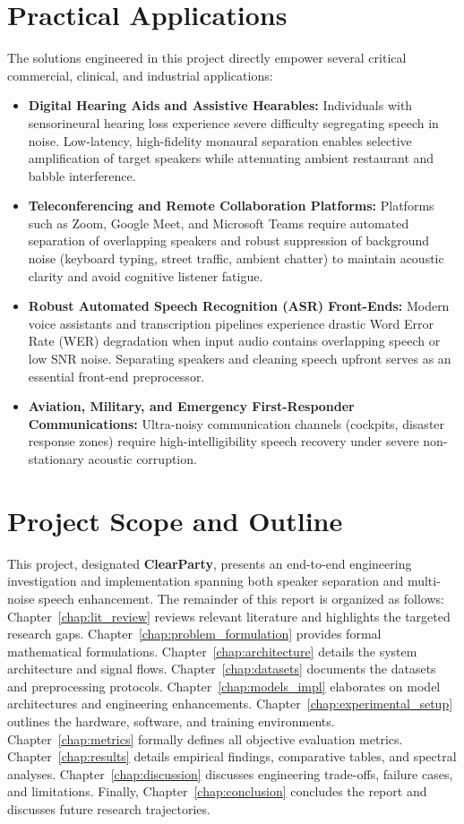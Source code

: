 \documentclass[11pt,a4paper]{report}
\begin{document}
\section{Practical Applications}
The solutions engineered in this project directly empower several critical commercial, clinical, and industrial applications:
\begin{itemize}
    \item \textbf{Digital Hearing Aids and Assistive Hearables:} Individuals with sensorineural hearing loss experience severe difficulty segregating speech in noise. Low-latency, high-fidelity monaural separation enables selective amplification of target speakers while attenuating ambient restaurant and babble interference.
    \item \textbf{Teleconferencing and Remote Collaboration Platforms:} Platforms such as Zoom, Google Meet, and Microsoft Teams require automated separation of overlapping speakers and robust suppression of background noise (keyboard typing, street traffic, ambient chatter) to maintain acoustic clarity and avoid cognitive listener fatigue.
    \item \textbf{Robust Automated Speech Recognition (ASR) Front-Ends:} Modern voice assistants and transcription pipelines experience drastic Word Error Rate (WER) degradation when input audio contains overlapping speech or low SNR noise. Separating speakers and cleaning speech upfront serves as an essential front-end preprocessor.
    \item \textbf{Aviation, Military, and Emergency First-Responder Communications:} Ultra-noisy communication channels (cockpits, disaster response zones) require high-intelligibility speech recovery under severe non-stationary acoustic corruption.
\end{itemize}

\section{Project Scope and Outline}
This project, designated \textbf{ClearParty}, presents an end-to-end engineering investigation and implementation spanning both speaker separation and multi-noise speech enhancement. The remainder of this report is organized as follows:
Chapter~\ref{chap:lit_review} reviews relevant literature and highlights the targeted research gaps. Chapter~\ref{chap:problem_formulation} provides formal mathematical formulations. Chapter~\ref{chap:architecture} details the system architecture and signal flows. Chapter~\ref{chap:datasets} documents the datasets and preprocessing protocols. Chapter~\ref{chap:models_impl} elaborates on model architectures and engineering enhancements. Chapter~\ref{chap:experimental_setup} outlines the hardware, software, and training environments. Chapter~\ref{chap:metrics} formally defines all objective evaluation metrics. Chapter~\ref{chap:results} details empirical findings, comparative tables, and spectral analyses. Chapter~\ref{chap:discussion} discusses engineering trade-offs, failure cases, and limitations. Finally, Chapter~\ref{chap:conclusion} concludes the report and discusses future research trajectories.
\end{document}

